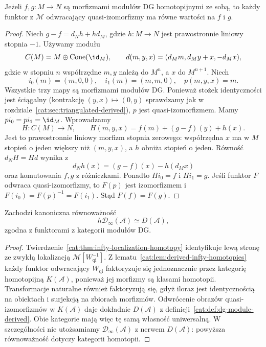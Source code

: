 \begin{lemat}\label{cat:lem:derived-infty-homotopies}
Jeżeli $f,g:M\to N$ są morfizmami modułów DG homotopijnymi ze sobą, to każdy funktor z $\mathcal M$ odwracający quasi-izomorfizmy ma równe wartości na $f$ i $g$.
\end{lemat}
\begin{proof}
Niech $g-f=d_Nh+hd_M$, gdzie $h:M\to N$ jest prawostronnie liniowy stopnia $-1$. Używamy modułu
\[
 C(M)=M\oplus\operatorname{Cone}(\id_M),\qquad
 d(m,y,x)=(d_Mm,d_My+x,-d_Mx),
\]
gdzie w stopniu $n$ współrzędne $m,y$ należą do $M^n$, a $x$ do $M^{n+1}$. Niech
\[
 i_0(m)=(m,0,0),\quad i_1(m)=(m,m,0),\quad p(m,y,x)=m.
\]
Wszystkie trzy mapy są morfizmami modułów DG. Ponieważ stożek identyczności jest ściągalny (kontrakcję $(y,x)\mapsto(0,y)$ sprawdzamy jak w rozdziale~\ref{cat:sec:triangulated-derived}), $p$ jest quasi-izomorfizmem. Mamy $pi_0=pi_1=\id_M$. Wprowadzamy
\[
 H:C(M)\to N,\qquad H(m,y,x)=f(m)+(g-f)(y)+h(x).
\]
Jest to prawostronnie liniowy morfizm stopnia zerowego: współrzędna $x$ ma w $M$ stopień o jeden większy niż $(m,y,x)$, a $h$ obniża stopień o jeden. Równość $d_NH=Hd$ wynika z
\[
 d_Nh(x)=(g-f)(x)-h(d_Mx)
\]
oraz komutowania $f,g$ z różniczkami. Ponadto $Hi_0=f$ i $Hi_1=g$. Jeśli funktor $F$ odwraca quasi-izomorfizmy, to $F(p)$ jest izomorfizmem i $F(i_0)=F(p)^{-1}=F(i_1)$. Stąd $F(f)=F(g)$.
\end{proof}

\begin{wniosek}\label{cat:cor:derived-infty-homotopy}
Zachodzi kanoniczna równoważność
\[
 h\mathcal D_\infty(\mathcal A)\simeq D(\mathcal A),
\]
zgodna z funktorami z kategorii modułów DG.
\end{wniosek}
\begin{proof}
Twierdzenie~\ref{cat:thm:infty-localization-homotopy} identyfikuje lewą stronę ze zwykłą lokalizacją $\mathcal M[W_{\mathrm{qi}}^{-1}]$. Z lematu~\ref{cat:lem:derived-infty-homotopies} każdy funktor odwracający $W_{\mathrm{qi}}$ faktoryzuje się jednoznacznie przez kategorię homotopijną $K(\mathcal A)$, ponieważ jej morfizmy są klasami homotopii. Transformacje naturalne również faktoryzują się, gdyż iloraz jest identycznością na obiektach i surjekcją na zbiorach morfizmów. Odwrócenie obrazów quasi-izomorfizmów w $K(\mathcal A)$ daje dokładnie $D(\mathcal A)$ z definicji~\ref{cat:def:dg-module-derived}. Obie kategorie mają więc tę samą własność uniwersalną. W szczególności nie utożsamiamy $\mathcal D_\infty(\mathcal A)$ z nerwem $D(\mathcal A)$: powyższa równoważność dotyczy kategorii homotopii.
\end{proof}

